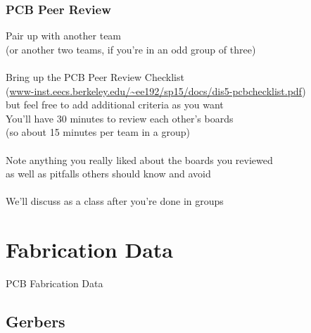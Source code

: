 \documentclass{beamer}
\begin{document}
\begin{frame}
\frametitle{PCB Peer Review}
\centering
Pair up with another team \\
{\tiny (or another two teams, if you're in an odd group of three)} \\
\hfill \\
Bring up the PCB Peer Review Checklist \\
{\tiny (\url{www-inst.eecs.berkeley.edu/~ee192/sp15/docs/dis5-pcbchecklist.pdf})} \\
{\tiny but feel free to add additional criteria as you want} \\
You'll have 30 minutes to review each other's boards \\
{\tiny (so about 15 minutes per team in a group)} \\
\hfill \\
Note anything you really liked about the boards you reviewed \\
{\tiny as well as pitfalls others should know and avoid} \\
\hfill \\
We'll discuss as a class after you're done in groups
\end{frame}

\section{Fabrication Data} %
\begin{frame}
\centering \huge PCB Fabrication Data
\end{frame}

\subsection{Gerbers}
\end{document}
